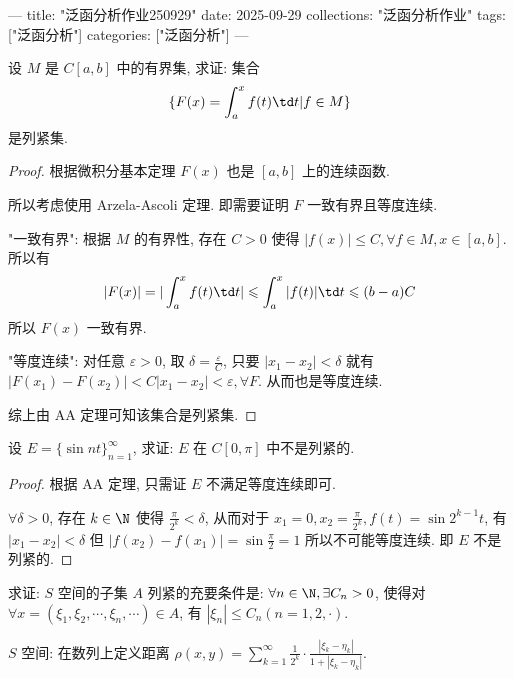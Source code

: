 ---
title: "泛函分析作业250929"
date: 2025-09-29
collections: "泛函分析作业"
tags: ["泛函分析"]
categories: ["泛函分析"]
---

\problem[1.3.5] 设 $M$ 是 $C[a,b]$ 中的有界集, 求证: 集合 $$\{F(x)=\int_a^x f(t)\td t|f\in M\}$$ 是列紧集.

\begin{proof}
	根据微积分基本定理 $F(x)$ 也是 $[a,b]$ 上的连续函数.

	所以考虑使用 Arzela-Ascoli 定理. 即需要证明 $F$  一致有界且等度连续.

	"一致有界": 根据 $M$ 的有界性, 存在 $C>0$ 使得 $|f(x)|\leqslant C,\forall f\in M, x\in[a,b]$. 所以有 $$|F(x)|=|\int_a^x f(t)\td t|\leqslant\int_a^x|f(t)|\td t\leqslant (b-a)C$$ 所以 $F(x)$ 一致有界.

	"等度连续": 对任意 $\varepsilon>0$, 取 $\delta=\frac{\varepsilon}{C}$, 只要 $|x_1-x_2|<\delta$ 就有 $|F(x_1)-F(x_2)|<C|x_1-x_2|<\varepsilon,\forall F$. 从而也是等度连续.

	综上由 AA 定理可知该集合是列紧集.
\end{proof}

\problem[1.3.6] 设 $E=\{\sin nt\}_{n=1}^\infty$, 求证: $E$ 在 $C[0,\pi]$ 中不是列紧的.

\begin{proof}
	根据 AA 定理, 只需证 $E$ 不满足等度连续即可.

	$\forall \delta>0$, 存在 $k\in\N$ 使得 $\frac \pi{2^k}<\delta$, 从而对于 $x_1=0,x_2=\frac \pi {2^k}, f(t)=\sin 2^{k-1}t$, 有 $|x_1-x_2|<\delta$ 但 $|f(x_2)-f(x_1)|=\sin\frac\pi{2}=1$ 所以不可能等度连续. 即 $E$ 不是列紧的.
\end{proof}

\problem[1.3.7] 求证: $S$ 空间的子集 $A$ 列紧的充要条件是: $\forall n\in \N,\exists C_n>0$, 使得对 $\forall x=(\xi_1,\xi_2,\cdots,\xi_n,\cdots)\in A$, 有 $|\xi_n|\leqslant C_n(n=1,2,\cdot)$.

$S$ 空间: 在数列上定义距离 $\rho(x,y)=\sum\limits_{k=1}^\infty \frac{1}{2^k}\cdot\frac{|\xi_k-\eta_k|}{1+|\xi_k-\eta_k|}$.

